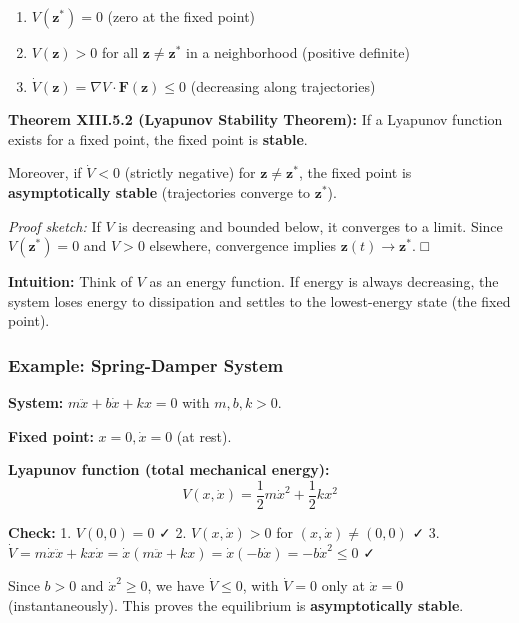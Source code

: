 \documentclass[
]{article}
\providecommand{\tightlist}{%
  \setlength{\itemsep}{0pt}\setlength{\parskip}{0pt}}
\begin{document}
\begin{enumerate}
\def\labelenumi{\arabic{enumi}.}
\tightlist
\item
  \(V(\mathbf{z}^*) = 0\) (zero at the fixed point)
\item
  \(V(\mathbf{z}) > 0\) for all \(\mathbf{z} \neq \mathbf{z}^*\) in a
  neighborhood (positive definite)
\item
  \(\dot{V}(\mathbf{z}) = \nabla V \cdot \mathbf{F}(\mathbf{z}) \leq 0\)
  (decreasing along trajectories)
\end{enumerate}

\textbf{Theorem XIII.5.2 (Lyapunov Stability Theorem):} If a Lyapunov
function exists for a fixed point, the fixed point is \textbf{stable}.

Moreover, if \(\dot{V} < 0\) (strictly negative) for
\(\mathbf{z} \neq \mathbf{z}^*\), the fixed point is
\textbf{asymptotically stable} (trajectories converge to
\(\mathbf{z}^*\)).

\emph{Proof sketch:} If \(V\) is decreasing and bounded below, it
converges to a limit. Since \(V(\mathbf{z}^*) = 0\) and \(V > 0\)
elsewhere, convergence implies \(\mathbf{z}(t) \to \mathbf{z}^*\). □

\textbf{Intuition:} Think of \(V\) as an energy function. If energy is
always decreasing, the system loses energy to dissipation and settles to
the lowest-energy state (the fixed point).

\subsubsection{Example: Spring-Damper
System}\label{example-spring-damper-system}

\textbf{System:} \(m\ddot{x} + b\dot{x} + kx = 0\) with \(m, b, k > 0\).

\textbf{Fixed point:} \(x = 0, \dot{x} = 0\) (at rest).

\textbf{Lyapunov function (total mechanical energy):}
\[V(x, \dot{x}) = \frac{1}{2}m\dot{x}^2 + \frac{1}{2}kx^2\]

\textbf{Check:} 1. \(V(0, 0) = 0\) ✓ 2. \(V(x, \dot{x}) > 0\) for
\((x, \dot{x}) \neq (0, 0)\) ✓ 3.
\(\dot{V} = m\dot{x}\ddot{x} + kx\dot{x} = \dot{x}(m\ddot{x} + kx) = \dot{x}(-b\dot{x}) = -b\dot{x}^2 \leq 0\)
✓

Since \(b > 0\) and \(\dot{x}^2 \geq 0\), we have \(\dot{V} \leq 0\),
with \(\dot{V} = 0\) only at \(\dot{x} = 0\) (instantaneously). This
proves the equilibrium is \textbf{asymptotically stable}.
\end{document}
